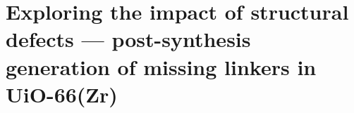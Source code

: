 
\graphicspath{ {\thisch/figures/} }

\chapter{Exploring the impact of structural defects --- post-synthesis generation of missing linkers in UiO-66(Zr)}%
\label{def}








